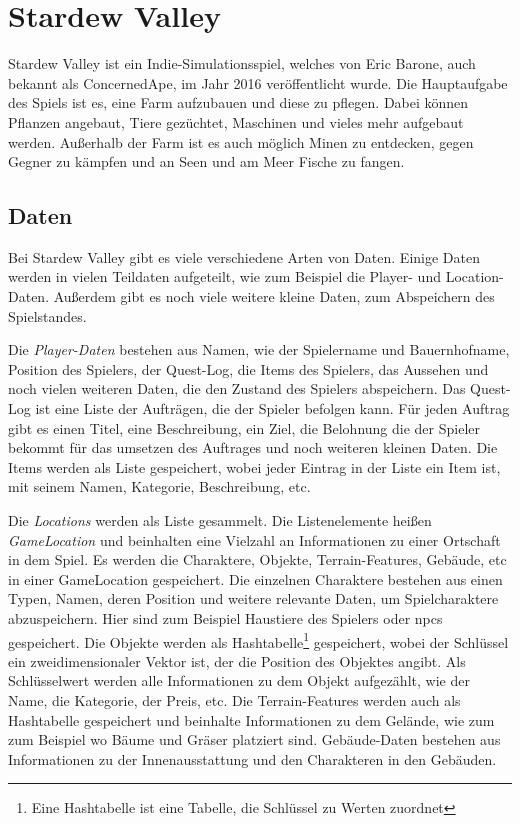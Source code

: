 \newpage

\section{Stardew Valley}
Stardew Valley ist ein Indie-Simulationsspiel, welches von Eric Barone, auch bekannt als ConcernedApe, im Jahr 2016 veröffentlicht wurde. Die Hauptaufgabe des Spiels ist es, eine Farm aufzubauen und diese zu pflegen. Dabei können Pflanzen angebaut, Tiere gezüchtet, Maschinen und vieles mehr aufgebaut werden. Außerhalb der Farm ist es auch möglich Minen zu entdecken, gegen Gegner zu kämpfen und an Seen und am Meer Fische zu fangen.\cite{steampoweredStardewValley} 


\subsection{Daten}
Bei Stardew Valley gibt es viele verschiedene Arten von Daten. Einige Daten werden in vielen Teildaten aufgeteilt, wie zum Beispiel die Player- und Location-Daten. Außerdem gibt es noch viele weitere kleine Daten, zum Abspeichern des Spielstandes.

Die \textit{Player-Daten} bestehen aus Namen, wie der Spielername und Bauernhofname, Position des Spielers, der Quest-Log, die Items des Spielers, das Aussehen und noch vielen weiteren Daten, die den Zustand des Spielers abspeichern. Das Quest-Log ist eine Liste der Aufträgen, die der Spieler befolgen kann. Für jeden Auftrag gibt es einen Titel, eine Beschreibung, ein Ziel, die Belohnung die der Spieler bekommt für das umsetzen des Auftrages und noch weiteren kleinen Daten. Die Items werden als Liste gespeichert, wobei jeder Eintrag in der Liste ein Item ist, mit seinem Namen, Kategorie, Beschreibung, \ac{etc}. 

Die \textit{Locations} werden als Liste gesammelt. Die Listenelemente heißen \textit{GameLocation} und beinhalten eine Vielzahl an Informationen zu einer Ortschaft in dem Spiel. Es werden die Charaktere, Objekte, Terrain-Features, Gebäude, \ac{etc} in einer GameLocation gespeichert. Die einzelnen Charaktere bestehen aus einen Typen, Namen, deren Position und weitere relevante Daten, um Spielcharaktere abzuspeichern. Hier sind zum Beispiel Haustiere des Spielers oder \acp{npc} gespeichert. Die Objekte werden als Hashtabelle\footnote{Eine Hashtabelle ist eine Tabelle, die Schlüssel zu Werten zuordnet} gespeichert, wobei der Schlüssel ein zweidimensionaler Vektor ist, der die Position des Objektes angibt. Als Schlüsselwert werden alle Informationen zu dem Objekt aufgezählt, wie der Name, die Kategorie, der Preis, \ac{etc}. Die Terrain-Features werden auch als Hashtabelle gespeichert und beinhalte Informationen zu dem Gelände, wie zum zum Beispiel wo Bäume und Gräser platziert sind. Gebäude-Daten bestehen aus Informationen zu der Innenausstattung und den Charakteren in den Gebäuden.

